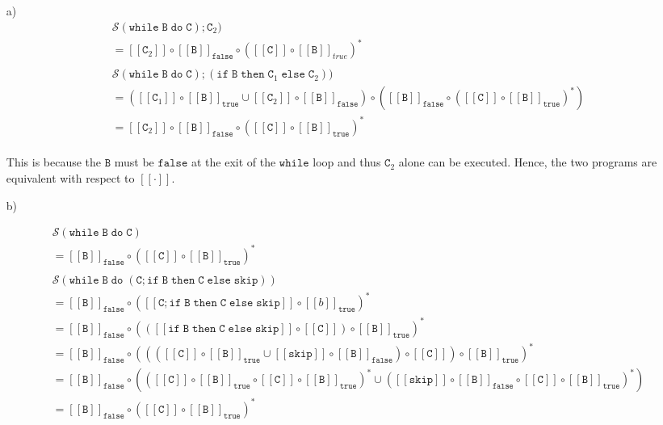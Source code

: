 \documentclass{article}
\newcommand{\B}{\mathtt{B}}
\newcommand{\C}{\mathtt{C}}
\newcommand{\true}{\mathtt{true}}
\newcommand{\false}{\mathtt{false}}
\newcommand{\ifsym}{\mathtt{if}}
\newcommand{\then}{\mathtt{then}}
\newcommand{\elsesym}{\mathtt{else}}
\newcommand{\whilesym}{\mathtt{while}}
\newcommand{\dosym}{\mathtt{do}}
\newcommand{\skipsym}{\mathtt{skip}}
\begin{document}
\begin{enumerate}
\begin{enumerate}
\item[a)] 
\begin{align*}
& \mathcal{S}(\whilesym \; \B \; \dosym \; \C);\C_2) \\
& = [[\C_2]] \circ [[\B]]_{\false} \circ ([[\C]] \circ [[\B]]_{true} )^{*}\\
& \\
& \mathcal{S}(\whilesym\; \B \; \dosym \; \C); (\ifsym \; \B \; \then
\; \C_1 \; \elsesym \; \C_2)) \\
& =  ([[\C_1]] \circ [[\B]]_{\true} \cup [[\C_2]] \circ [[\B]]_{\false})
\circ  
([[\B]]_{\false} \circ ([[\C]] \circ [[\B]]_{\true} )^{*}) \\
& =  [[\C_2]] \circ [[\B]]_{\false} \circ ([[\C]] \circ [[\B]]_{\true} )^{*}
\end{align*}\\

This is because the $\B$ must be $\false$ at the exit of the $\whilesym$ loop
and thus $\C_2$ alone can be executed.
Hence, the two programs are equivalent with respect to $[[\cdot]]$.\\

\item[b)]

\begin{align*}
& \mathcal{S}(\whilesym\; \B \; \dosym \; \C) \\
& = [[\B]]_{\false} \circ ([[\C]] \circ [[\B]]_{\true} )^{*} \\
& \\
& \mathcal{S}(\whilesym \; \B \; \dosym \; (\C;\ifsym \; \B \; \then \; \C \;
\elsesym \; \skipsym)) \\
& = [[\B]]_{\false} \circ ([[\C; \ifsym \; \B \; \then \; \C \;
\elsesym \; \skipsym]] \circ [[b]]_{\true} )^{*} \\
& = [[\B]]_{\false} \circ ( ([[\ifsym \; \B \; \then \; \C \;
\elsesym \; \skipsym]] \circ [[\C]]) \circ [[\B]]_{\true} )^{*} \\
& = [[\B]]_{\false} \circ ( ( ([[\C]] \circ [[\B]]_{\true} \cup [[\skipsym]]
\circ [[\B]]_{\false}) \circ [[\C]]) \circ [[\B]]_{\true} )^{*} \\
& = [[\B]]_{\false} \circ ( ([[\C]] \circ [[\B]]_{\true} 
\circ [[\C]] \circ [[\B]]_{\true} )^{*} \cup 
([[\skipsym]] \circ [[\B]]_{\false} \circ [[\C]] \circ [[\B]]_{\true} )^{*} ) \\
& =  [[\B]]_{\false} \circ ([[\C]] \circ [[\B]]_{\true} )^{*} \\
\end{align*}


\end{enumerate}
\end{enumerate}
\end{document}
